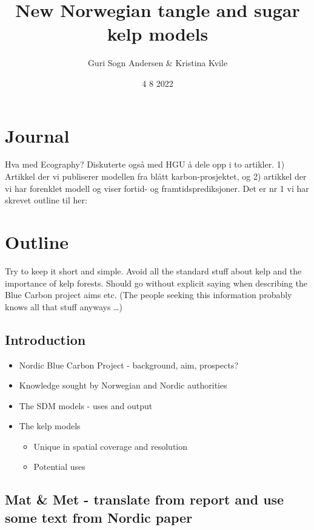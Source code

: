 \documentclass[
]{article}
\title{New Norwegian tangle and sugar kelp models}
\author{Guri Sogn Andersen \& Kristina Kvile}
\date{4 8 2022}
\providecommand{\tightlist}{%
  \setlength{\itemsep}{0pt}\setlength{\parskip}{0pt}}
\begin{document}
\maketitle

\hypertarget{journal}{%
\section{Journal}\label{journal}}

Hva med Ecography? Diskuterte også med HGU å dele opp i to artikler. 1)
Artikkel der vi publiserer modellen fra blått karbon-prosjektet, og 2)
artikkel der vi har forenklet modell og viser fortid- og
framtidsprediksjoner. Det er nr 1 vi har skrevet outline til her:

\hypertarget{outline}{%
\section{Outline}\label{outline}}

Try to keep it short and simple. Avoid all the standard stuff about kelp
and the importance of kelp forests. Should go without explicit saying
when describing the Blue Carbon project aims etc. (The people seeking
this information probably knows all that stuff anyways \ldots)

\hypertarget{introduction}{%
\subsection{Introduction}\label{introduction}}

\begin{itemize}
\tightlist
\item
  Nordic Blue Carbon Project - background, aim, prospects?
\item
  Knowledge sought by Norwegian and Nordic authorities
\item
  The SDM models - uses and output
\item
  The kelp models

  \begin{itemize}
  \tightlist
  \item
    Unique in spatial coverage and resolution
  \item
    Potential uses
  \end{itemize}
\end{itemize}

\hypertarget{mat-met---translate-from-report-and-use-some-text-from-nordic-paper}{%
\subsection{Mat \& Met - translate from report and use some text from
Nordic
paper}\label{mat-met---translate-from-report-and-use-some-text-from-nordic-paper}}
\end{document}
